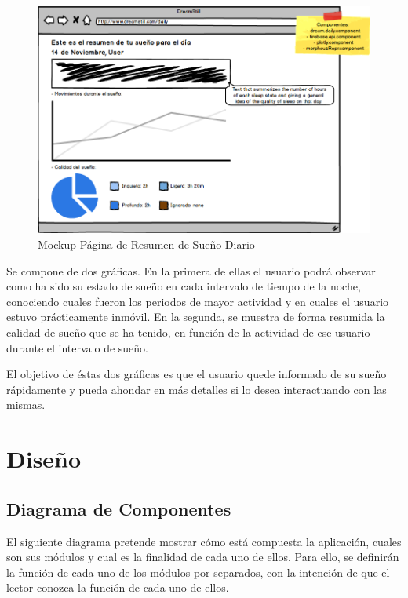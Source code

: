 \documentclass[11pt,openany]{book}
\begin{document}
\begin{figure}[H]
\centering
\includegraphics[totalheight=6.5cm]{mockups/DailyDreamPage.png}
\caption{Mockup Página de Resumen de Sueño Diario}
\end{figure}
\par\bigskip 
\noindent

Se compone de dos gráficas. En la primera de ellas el usuario podrá observar como ha sido su estado de sueño en cada intervalo de tiempo de la noche, conociendo cuales fueron los periodos de mayor actividad y en cuales el usuario estuvo prácticamente inmóvil. En la segunda, se muestra de forma resumida la calidad de sueño que se ha tenido, en función de la actividad de ese usuario durante el intervalo de sueño. 

El objetivo de éstas dos gráficas es que el usuario quede informado de su sueño rápidamente y pueda ahondar en más detalles si lo desea interactuando con las mismas.

\pagebreak
\section{Diseño}

\subsection{Diagrama de Componentes}
 
 El siguiente diagrama pretende mostrar cómo está compuesta la aplicación, cuales son sus módulos y cual es la finalidad de cada uno de ellos. Para ello, se definirán la función de cada uno de los módulos por separados, con la intención de que el lector conozca la función de cada uno de ellos.
 
\end{document}
